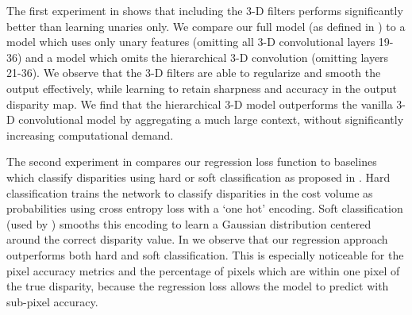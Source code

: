 \documentclass[10pt,twocolumn,letterpaper]{article}
\begin{document}
The first experiment in  shows that including the 3-D filters performs significantly better than learning unaries only. We compare our full model (as defined in ) to a model which uses only unary features (omitting all 3-D convolutional layers 19-36) and a model which omits the hierarchical 3-D convolution (omitting layers 21-36).  We observe that the 3-D filters are able to regularize and smooth the output effectively, while learning to retain sharpness and accuracy in the output disparity map. We find that the hierarchical 3-D model outperforms the vanilla 3-D convolutional model by aggregating a much large context, without significantly increasing computational demand.

The second experiment in  compares our regression loss function to baselines which classify disparities using hard or soft classification as proposed in \cite{luo2016efficient}. Hard classification trains the network to classify disparities in the cost volume as probabilities using cross entropy loss with a `one hot' encoding. Soft classification (used by \cite{luo2016efficient}) smooths this encoding to learn a Gaussian distribution centered around the correct disparity value. In  we observe that our regression approach outperforms both hard and soft classification. This is especially noticeable for the pixel accuracy metrics and the percentage of pixels which are within one pixel of the true disparity, because the regression loss allows the model to predict with sub-pixel accuracy.
\end{document}

